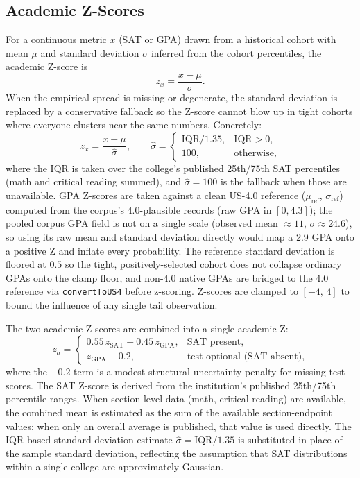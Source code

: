 \documentclass[conference]{IEEEtran}
\begin{document}
\subsection{Academic Z-Scores}
\label{sec:academic}
For a continuous metric $x$ (SAT or GPA) drawn from a historical cohort with mean $\mu$ and standard deviation $\sigma$ inferred from the cohort percentiles, the academic Z-score is
\begin{equation}
z_x = \frac{x - \mu}{\sigma}.
\end{equation}
When the empirical spread is missing or degenerate, the standard deviation is replaced by a conservative fallback so the Z-score cannot blow up in tight cohorts where everyone clusters near the same numbers. Concretely:
\begin{equation}
z_x = \frac{x - \mu}{\hat{\sigma}}, \qquad \hat{\sigma} =
\begin{cases}
\text{IQR}/1.35, & \text{IQR} > 0,\\[2pt]
100, & \text{otherwise},
\end{cases}
\end{equation}
where the IQR is taken over the college's published 25th/75th SAT percentiles (math and critical reading summed), and $\hat{\sigma}=100$ is the fallback when those are unavailable. GPA Z-scores are taken against a clean US-4.0 reference ($\mu_{\text{ref}}$, $\sigma_{\text{ref}}$) computed from the corpus's 4.0-plausible records (raw GPA in $[0,4.3]$); the pooled corpus GPA field is not on a single scale (observed mean $\approx 11$, $\sigma \approx 24.6$), so using its raw mean and standard deviation directly would map a 2.9 GPA onto a positive Z and inflate every probability. The reference standard deviation is floored at $0.5$ so the tight, positively-selected cohort does not collapse ordinary GPAs onto the clamp floor, and non-4.0 native GPAs are bridged to the 4.0 reference via \texttt{convertToUS4} before z-scoring. Z-scores are clamped to $[-4,\,4]$ to bound the influence of any single tail observation.

The two academic Z-scores are combined into a single academic Z:
\begin{equation}
z_a =
\begin{cases}
0.55\,z_{\text{SAT}} + 0.45\,z_{\text{GPA}}, & \text{SAT present},\\[2pt]
z_{\text{GPA}} - 0.2, & \text{test-optional (SAT absent)},
\end{cases}
\end{equation}
where the $-0.2$ term is a modest structural-uncertainty penalty for missing test scores. The SAT Z-score is derived from the institution's published 25th/75th percentile ranges. When section-level data (math, critical reading) are available, the combined mean is estimated as the sum of the available section-endpoint values; when only an overall average is published, that value is used directly. The IQR-based standard deviation estimate $\hat{\sigma} = \text{IQR}/1.35$ is substituted in place of the sample standard deviation, reflecting the assumption that SAT distributions within a single college are approximately Gaussian.
\end{document}
